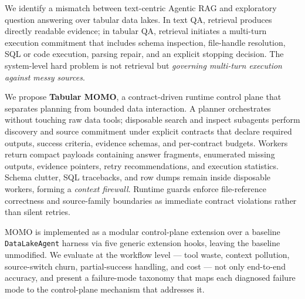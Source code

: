 We identify a mismatch between text-centric Agentic RAG and exploratory question answering over tabular data lakes. In text QA, retrieval produces directly readable evidence; in tabular QA, retrieval initiates a multi-turn execution commitment that includes schema inspection, file-handle resolution, SQL or code execution, parsing repair, and an explicit stopping decision. The system-level hard problem is not retrieval but \emph{governing multi-turn execution against messy sources}.

We propose \textbf{Tabular MOMO}, a contract-driven runtime control plane that separates planning from bounded data interaction. A planner orchestrates without touching raw data tools; disposable search and inspect subagents perform discovery and source commitment under explicit contracts that declare required outputs, success criteria, evidence schemas, and per-contract budgets. Workers return compact payloads containing answer fragments, enumerated missing outputs, evidence pointers, retry recommendations, and execution statistics. Schema clutter, SQL tracebacks, and row dumps remain inside disposable workers, forming a \emph{context firewall}. Runtime guards enforce file-reference correctness and source-family boundaries as immediate contract violations rather than silent retries.

MOMO is implemented as a modular control-plane extension over a baseline \texttt{DataLakeAgent} harness via five generic extension hooks, leaving the baseline unmodified. We evaluate at the workflow level --- tool waste, context pollution, source-switch churn, partial-success handling, and cost --- not only end-to-end accuracy, and present a failure-mode taxonomy that maps each diagnosed failure mode to the control-plane mechanism that addresses it.
